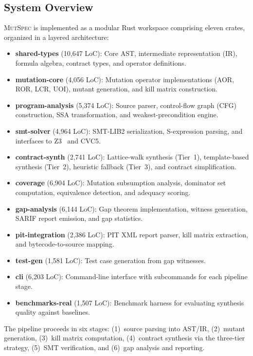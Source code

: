 \documentclass[11pt]{article}
\begin{document}
\subsection{System Overview}
\label{sec:overview}

\textsc{MutSpec} is implemented as a modular Rust workspace comprising eleven
crates, organized in a layered architecture:

\begin{itemize}[leftmargin=*]
  \item \textbf{shared-types} (10,647 LoC): Core AST, intermediate representation
    (IR), formula algebra, contract types, and operator definitions.
  \item \textbf{mutation-core} (4,056 LoC): Mutation operator implementations
    (AOR, ROR, LCR, UOI), mutant generation, and kill matrix construction.
  \item \textbf{program-analysis} (5,374 LoC): Source parser, control-flow graph
    (CFG) construction, SSA transformation, and weakest-precondition engine.
  \item \textbf{smt-solver} (4,964 LoC): SMT-LIB2 serialization, S-expression
    parsing, and interfaces to Z3~\cite{demoura2008} and CVC5.
  \item \textbf{contract-synth} (2,741 LoC): Lattice-walk synthesis (Tier~1),
    template-based synthesis (Tier~2), heuristic fallback (Tier~3), and contract
    simplification.
  \item \textbf{coverage} (6,904 LoC): Mutation subsumption analysis, dominator
    set computation, equivalence detection, and adequacy scoring.
  \item \textbf{gap-analysis} (6,144 LoC): Gap theorem implementation, witness
    generation, SARIF report emission, and gap statistics.
  \item \textbf{pit-integration} (2,386 LoC): PIT XML report parser, kill
    matrix extraction, and bytecode-to-source mapping.
  \item \textbf{test-gen} (1,581 LoC): Test case generation from gap witnesses.
  \item \textbf{cli} (6,203 LoC): Command-line interface with subcommands for
    each pipeline stage.
  \item \textbf{benchmarks-real} (1,507 LoC): Benchmark harness for evaluating
    synthesis quality against baselines.
\end{itemize}

The pipeline proceeds in six stages: (1)~source parsing into AST/IR,
(2)~mutant generation, (3)~kill matrix computation, (4)~contract synthesis via
the three-tier strategy, (5)~SMT verification, and (6)~gap analysis and
reporting.
\end{document}
